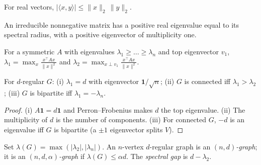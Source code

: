 \begin{lemma}
  \label{lem:cauchy-schwarz}
  \mathlibok
  For real vectors, $|\langle x,y\rangle|\le\|x\|_2\,\|y\|_2$.
\end{lemma}

\begin{lemma}
  \label{lem:perron-frobenius}
  \mathlibok
  An irreducible nonnegative matrix has a positive real eigenvalue equal to its
  spectral radius, with a positive eigenvector of multiplicity one.
\end{lemma}

\begin{lemma}
  \label{lem:rayleigh-variational}
  \mathlibok
  For a symmetric $A$ with eigenvalues $\lambda_1\ge\dots\ge\lambda_n$ and top
  eigenvector $v_1$, $\lambda_1=\max_x\frac{x^\top Ax}{\|x\|^2}$ and
  $\lambda_2=\max_{x\perp v_1}\frac{x^\top Ax}{\|x\|^2}$.
\end{lemma}

\begin{lemma}
  \label{lem:basic-spectrum}
  For $d$-regular $G$: (i) $\lambda_1=d$ with eigenvector $\mathbf 1/\sqrt n$;
  (ii) $G$ is connected iff $\lambda_1>\lambda_2$; (iii) $G$ is bipartite iff
  $\lambda_1=-\lambda_n$.
\end{lemma}
\begin{proof}
  (i) $A\mathbf 1=d\mathbf 1$ and Perron--Frobenius makes $d$ the top eigenvalue.
  (ii) The multiplicity of $d$ is the number of components. (iii) For connected
  $G$, $-d$ is an eigenvalue iff $G$ is bipartite (a $\pm1$ eigenvector splits
  $V$).
\end{proof}

\begin{definition}
  \label{def:lambda-G}
  Set $\lambda(G)=\max(|\lambda_2|,|\lambda_n|)$. An $n$-vertex $d$-regular graph
  is an \emph{$(n,d)$-graph}; it is an \emph{$(n,d,\alpha)$-graph} if
  $\lambda(G)\le\alpha d$. The \emph{spectral gap} is $d-\lambda_2$.
\end{definition}

